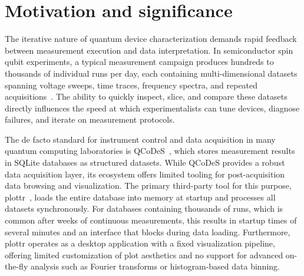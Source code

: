 
\section{Motivation and significance}

The iterative nature of quantum device characterization demands rapid feedback between measurement execution and data interpretation.
In semiconductor spin qubit experiments, a typical measurement campaign produces hundreds to thousands of individual runs per day, each containing multi-dimensional datasets spanning voltage sweeps, time traces, frequency spectra, and repeated acquisitions~\cite{nickl2025eight, steinacker2025industry}.
The ability to quickly inspect, slice, and compare these datasets directly influences the speed at which experimentalists can tune devices, diagnose failures, and iterate on measurement protocols.

The de facto standard for instrument control and data acquisition in many quantum computing laboratories is QCoDeS~\cite{qcodes}, which stores measurement results in SQLite databases as structured datasets.
While QCoDeS provides a robust data acquisition layer, its ecosystem offers limited tooling for post-acquisition data browsing and visualization.
The primary third-party tool for this purpose, plottr~\cite{plottr}, loads the entire database into memory at startup and processes all datasets synchronously.
For databases containing thousands of runs, which is common after weeks of continuous measurements, this results in startup times of several minutes and an interface that blocks during data loading.
Furthermore, plottr operates as a desktop application with a fixed visualization pipeline, offering limited customization of plot aesthetics and no support for advanced on-the-fly analysis such as Fourier transforms or histogram-based data binning.

